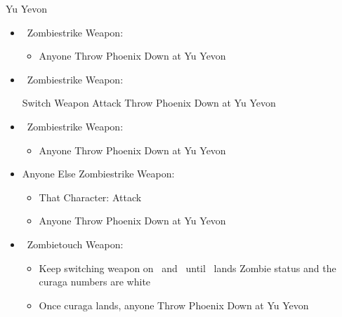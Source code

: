 \begin{battle}[99999]{Yu Yevon}
	\begin{itemize}
		\item \rikku\ Zombiestrike Weapon:
			\begin{itemize}
				\rikkuf Attack
				\item Anyone Throw Phoenix Down at Yu Yevon
			\end{itemize}
		\item \lulu\ Zombiestrike Weapon:
			\begin{itemize}
				\rikkuf Switch Weapon
				\luluf Attack
				\rikkuf Throw Phoenix Down at Yu Yevon
			\end{itemize}
		\item \kimahri\ Zombiestrike Weapon:
			\begin{itemize}
				\rikkuf Switch Weapon
				\kimahrif Attack
				\item Anyone Throw Phoenix Down at Yu Yevon
			\end{itemize}
		\item Anyone Else Zombiestrike Weapon:
			\begin{itemize}
				\item That Character: Attack
				\item Anyone Throw Phoenix Down at Yu Yevon
			\end{itemize}
		\item \rikku\ Zombietouch Weapon:
			\begin{itemize}
				\rikkuf Switch Weapon to Zombietouch Weapon
				\luluf Switch Weapon
				\rikkuf Attack
				\luluf If Curaga deals 9999 damage to Yu Yevon (White numbers) Throw Phoenix Down at Yu Yevon, otherwise Switch Weapon
				\item Keep switching weapon on \lulu\ and \kimahri\ until \rikku\ lands Zombie status and the curaga numbers are white
				\item Once curaga lands, anyone Throw Phoenix Down at Yu Yevon
			\end{itemize}
	\end{itemize}
\end{battle}
\bothvfill
\colstart